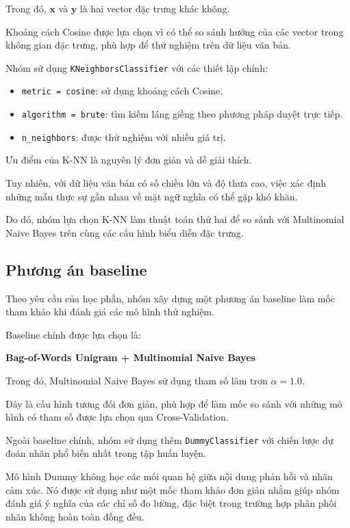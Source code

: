 Trong đó, $\mathbf{x}$ và $\mathbf{y}$ là hai vector đặc trưng khác không.

Khoảng cách Cosine được lựa chọn vì có thể so sánh hướng của các vector trong không gian đặc trưng, phù hợp để thử nghiệm trên dữ liệu văn bản.

Nhóm sử dụng \texttt{KNeighborsClassifier} với các thiết lập chính:

\begin{itemize}
    \item \texttt{metric = cosine}: sử dụng khoảng cách Cosine.

    \item \texttt{algorithm = brute}: tìm kiếm láng giềng theo phương pháp duyệt trực tiếp.

    \item \texttt{n\_neighbors}: được thử nghiệm với nhiều giá trị.
\end{itemize}

Ưu điểm của K-NN là nguyên lý đơn giản và dễ giải thích.

Tuy nhiên, với dữ liệu văn bản có số chiều lớn và độ thưa cao, việc xác định những mẫu thực sự gần nhau về mặt ngữ nghĩa có thể gặp khó khăn.

Do đó, nhóm lựa chọn K-NN làm thuật toán thứ hai để so sánh với Multinomial Naive Bayes trên cùng các cấu hình biểu diễn đặc trưng.


\subsection{Phương án baseline}

Theo yêu cầu của học phần, nhóm xây dựng một phương án baseline làm mốc tham khảo khi đánh giá các mô hình thử nghiệm.

Baseline chính được lựa chọn là:

\begin{center}
\textbf{Bag-of-Words Unigram + Multinomial Naive Bayes}
\end{center}

Trong đó, Multinomial Naive Bayes sử dụng tham số làm trơn $\alpha=1.0$.

Đây là cấu hình tương đối đơn giản, phù hợp để làm mốc so sánh với những mô hình có tham số được lựa chọn qua Cross-Validation.

Ngoài baseline chính, nhóm sử dụng thêm \texttt{DummyClassifier} với chiến lược dự đoán nhãn phổ biến nhất trong tập huấn luyện.

Mô hình Dummy không học các mối quan hệ giữa nội dung phản hồi và nhãn cảm xúc. Nó được sử dụng như một mốc tham khảo đơn giản nhằm giúp nhóm đánh giá ý nghĩa của các chỉ số đo lường, đặc biệt trong trường hợp phân phối nhãn không hoàn toàn đồng đều.


